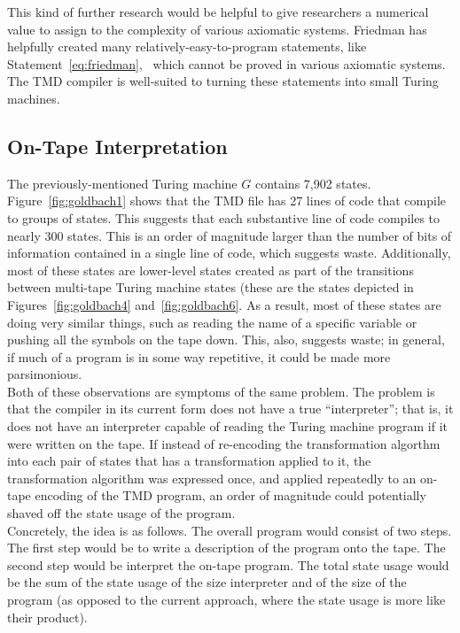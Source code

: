 \documentclass[11pt]{report}
\newcommand{\gbstatenum}{7,902 }
\begin{document}
This kind of further research would be helpful to give researchers a numerical value to assign to the complexity of various axiomatic systems. Friedman has helpfully created many relatively-easy-to-program statements, like Statement~\ref{eq:friedman},~\cite{friedmanlist} which cannot be proved in various axiomatic systems. The TMD compiler is well-suited to turning these statements into small Turing machines.

\subsection{On-Tape Interpretation}

The previously-mentioned Turing machine $G$ contains \gbstatenum states. Figure~\ref{fig:goldbach1} shows that the TMD file has 27 lines of code that compile to groups of states. This suggests that each substantive line of code compiles to nearly 300 states. This is an order of magnitude larger than the number of bits of information contained in a single line of code, which suggests waste. Additionally, most of these states are lower-level states created as part of the transitions between multi-tape Turing machine states (these are the states depicted in Figures~\ref{fig:goldbach4} and~\ref{fig:goldbach6}. As a result, most of these states are doing very similar things, such as reading the name of a specific variable or pushing all the symbols on the tape down. This, also, suggests waste; in general, if much of a program is in some way repetitive, it could be made more parsimonious. \\

Both of these observations are symptoms of the same problem. The problem is that the compiler in its current form does not have a true ``interpreter''; that is, it does not have an interpreter capable of reading the Turing machine program if it were written on the tape. If instead of re-encoding the transformation algorthm into each pair of states that has a transformation applied to it, the transformation algorithm was expressed once, and applied repeatedly to an on-tape encoding of the TMD program, an order of magnitude could potentially shaved off the state usage of the program. \\

Concretely, the idea is as follows. The overall program would consist of two steps. The first step would be to write a description of the program onto the tape. The second step would be interpret the on-tape program. The total state usage would be the sum of the state usage of the size interpreter and of the size of the program (as opposed to the current approach, where the state usage is more like their product). \\
\end{document}
